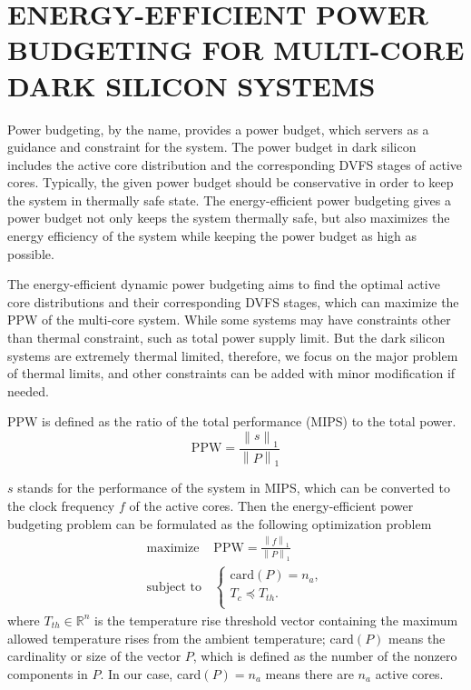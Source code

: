 \section{ENERGY-EFFICIENT POWER BUDGETING FOR MULTI-CORE DARK SILICON SYSTEMS}

Power budgeting, by the name, provides a power budget, which servers as a guidance and constraint for the system. The power budget in dark silicon includes the active core distribution and the corresponding DVFS stages of active cores. Typically, the given power budget should be conservative in order to keep the system in thermally safe state. The energy-efficient power budgeting gives a power budget not only keeps the system thermally safe, but also maximizes the energy efficiency of the system while keeping the power budget as high as possible.


The energy-efficient dynamic power budgeting aims to find the optimal active core distributions and their corresponding DVFS stages, which can maximize the PPW of the multi-core system. While some systems may have constraints other than thermal constraint, such as total power supply limit. But the dark silicon systems are extremely thermal limited, therefore, we focus on the major problem of thermal limits, and other constraints can be added with minor modification if needed.

PPW is defined as the ratio of the total performance (MIPS) to the total power.
\begin{equation}\label{eq:ppw}
\text{PPW} = \frac{\left \| s \right \|_{1}}{\left \| P \right \|_{1}}
\end{equation}

$s$ stands for the performance of the system in MIPS, which can be converted to the clock frequency $f$ of the active cores. Then the energy-efficient power budgeting problem can be formulated as the following optimization problem
\begin{equation}\label{eq:opt_ppw}
\begin{split}
\text{maximize } & \text{PPW} = \frac{\left \| f \right \|_{1}}{\left \| P \right \|_{1}}\\
\text{subject to} &\left\{
\begin{array}{lr}
\text{card}(P) = n_{a},\\
T_{c} \preceq T_{th}.\\
\end{array}
\right.
\end{split}
\end{equation}
where $T_{th} \in \mathbb{R}^{n}$ is the temperature rise threshold vector containing the maximum allowed temperature rises from the ambient temperature; card$(P)$ means the cardinality or size of the vector $P$, which is defined as the number of the nonzero components in $P$. In our case, card$(P) = n_{a}$ means there are $n_{a}$ active cores.

